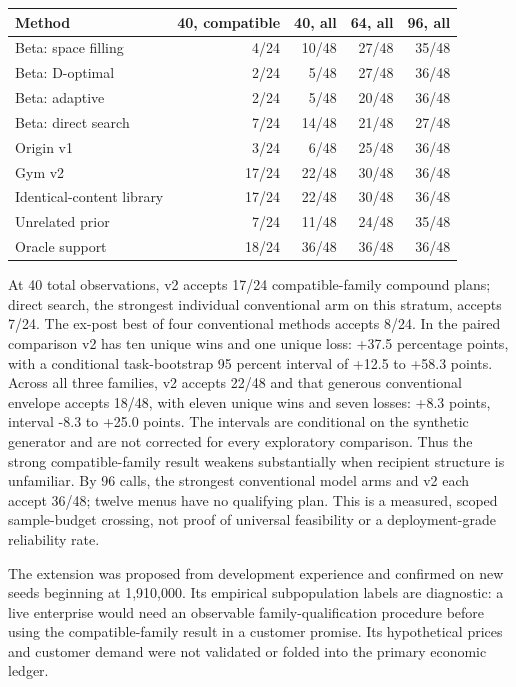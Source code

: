\begin{center}\small\begin{tabular}{lrrrr}
\toprule
Method & 40, compatible & 40, all & 64, all & 96, all \\ \midrule
Beta: space filling & 4/24 & 10/48 & 27/48 & 35/48 \\
Beta: D-optimal & 2/24 & 5/48 & 27/48 & 36/48 \\
Beta: adaptive & 2/24 & 5/48 & 20/48 & 36/48 \\
Beta: direct search & 7/24 & 14/48 & 21/48 & 27/48 \\
Origin v1 & 3/24 & 6/48 & 25/48 & 36/48 \\
Gym v2 & 17/24 & 22/48 & 30/48 & 36/48 \\
Identical-content library & 17/24 & 22/48 & 30/48 & 36/48 \\
Unrelated prior & 7/24 & 11/48 & 24/48 & 35/48 \\
Oracle support & 18/24 & 36/48 & 36/48 & 36/48 \\
\bottomrule
\end{tabular}\end{center}
At 40 total observations, v2 accepts 17/24 compatible-family compound plans; direct search, the strongest individual conventional arm on this stratum, accepts 7/24. The ex-post best of four conventional methods accepts 8/24. In the paired comparison v2 has ten unique wins and one unique loss: +37.5 percentage points, with a conditional task-bootstrap 95 percent interval of +12.5 to +58.3 points. Across all three families, v2 accepts 22/48 and that generous conventional envelope accepts 18/48, with eleven unique wins and seven losses: +8.3 points, interval -8.3 to +25.0 points. The intervals are conditional on the synthetic generator and are not corrected for every exploratory comparison. Thus the strong compatible-family result weakens substantially when recipient structure is unfamiliar. By 96 calls, the strongest conventional model arms and v2 each accept 36/48; twelve menus have no qualifying plan. This is a measured, scoped sample-budget crossing, not proof of universal feasibility or a deployment-grade reliability rate.\par The extension was proposed from development experience and confirmed on new seeds beginning at 1,910,000. Its empirical subpopulation labels are diagnostic: a live enterprise would need an observable family-qualification procedure before using the compatible-family result in a customer promise. Its hypothetical prices and customer demand were not validated or folded into the primary economic ledger.
